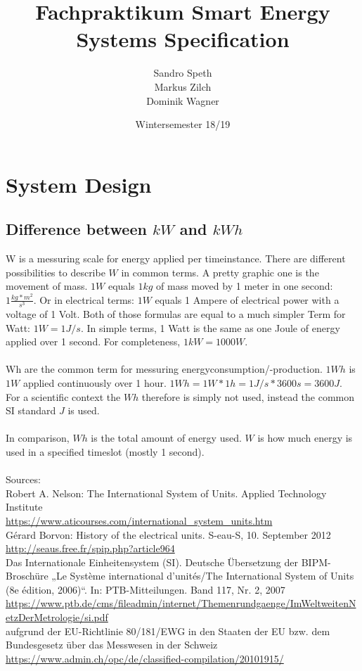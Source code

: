 \documentclass[12pt]{scrartcl}
\title{Fachpraktikum Smart Energy Systems
	Specification}
\date{Wintersemester 18/19}
\author{Sandro Speth\\
Markus Zilch\\
Dominik Wagner}
\begin{document}
\maketitle


\section{System Design}\label{sec:systemdesign}

\subsection{Difference between $kW$ and $kWh$}\label{sec:diffEnergy}
W is a messuring scale for energy applied per timeinstance.
There are different possibilities to describe $W$ in common terms.
A pretty graphic one is the movement of mass.
$1W$ equals $1kg$ of mass moved by 1 meter in one second: $1 \frac{kg*m^2}{s^3}$.
Or in electrical terms: $1W$ equals 1 Ampere of electrical power with a voltage of 1 Volt.
Both of those formulas are equal to a much simpler Term for Watt: $1 W = 1 J/s$.
In simple terms, 1 Watt is the same as one Joule of energy applied over 1 second.
For completeness, $1kW = 1000 W$.\\
\\
Wh are the common term for messuring energyconsumption/-production.
$1Wh$ is $1W$ applied continuously over 1 hour.
 $1Wh = 1 W * 1h = 1 J/s * 3600s = 3600J$.
 For a scientific context the $Wh$ therefore is simply not used, instead the common SI standard $J$ is used.\\
\\
In comparison, $Wh$ is the total amount of energy used. $W$ is how much energy is used in a specified timeslot (mostly 1 second).\\
\\
Sources:\\
Robert A. Nelson: The International System of Units. Applied Technology Institute\\
\url{https://www.aticourses.com/international_system_units.htm}\\
Gérard Borvon: History of the electrical units. S-eau-S, 10. September 2012\\
\url{http://seaus.free.fr/spip.php?article964}\\
Das Internationale Einheitensystem (SI). Deutsche Übersetzung der BIPM-Broschüre „Le Système international d’unités/The International System of Units (8e édition, 2006)“. In: PTB-Mitteilungen. Band 117, Nr. 2, 2007\\
\url{https://www.ptb.de/cms/fileadmin/internet/Themenrundgaenge/ImWeltweitenNetzDerMetrologie/si.pdf}\\
aufgrund der EU-Richtlinie 80/181/EWG in den Staaten der EU bzw. dem Bundesgesetz über das Messwesen in der Schweiz\\
\url{https://www.admin.ch/opc/de/classified-compilation/20101915/}
\end{document}
